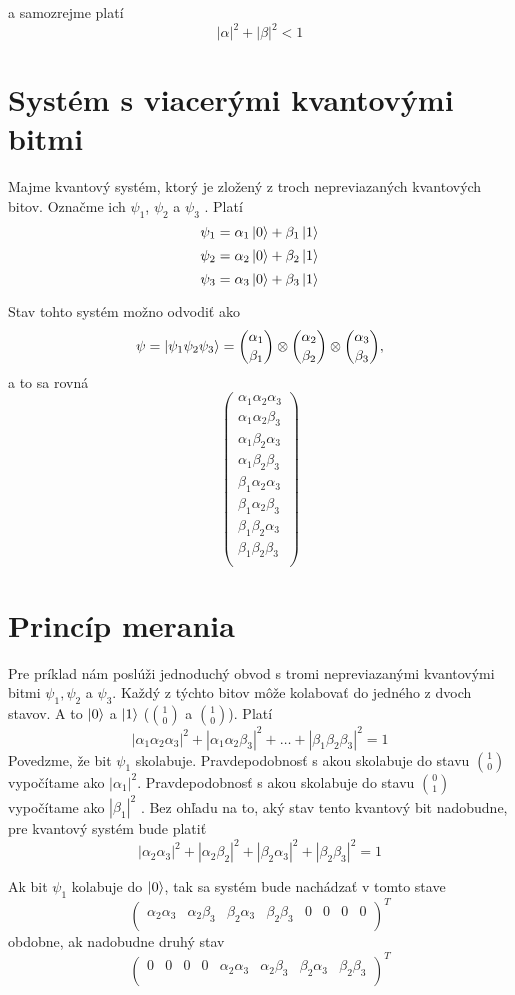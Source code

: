 a samozrejme platí
\[|\alpha|^{2} + |\beta|^{2} < 1\]

\section{Systém s viacerými kvantovými bitmi}
Majme kvantový systém, ktorý je zložený z troch nepreviazaných kvantových bitov.
Označme ich \(\psi_1\), \(\psi_2\) a \(\psi_3\) . Platí
\[\psi_1 = \alpha_1 \Ket{0} + \beta_1 \Ket{1}\]
\[\psi_2 = \alpha_2 \Ket{0} + \beta_2 \Ket{1}\]
\[\psi_3 = \alpha_3 \Ket{0} + \beta_3 \Ket{1}\]

Stav tohto systém možno odvodiť ako
\[\psi = \Ket{\psi_1 \psi_2 \psi_3} = \binom{\alpha_1}{\beta_1} \otimes \binom{\alpha_2}{\beta_2} \otimes \binom{\alpha_3}{\beta_3},\]
 a to sa rovná
\[
\begin{pmatrix}
    \alpha_1 \alpha_2 \alpha_3 \\
    \alpha_1 \alpha_2 \beta_3\\
    \alpha_1 \beta_2 \alpha_3\\
    \alpha_1 \beta_2 \beta_3\\
    \beta_1 \alpha_2 \alpha_3 \\
    \beta_1 \alpha_2 \beta_3\\
    \beta_1 \beta_2 \alpha_3\\
    \beta_1 \beta_2 \beta_3\\

 \end{pmatrix}
\]

\section{Princíp merania}
Pre príklad nám poslúži jednoduchý obvod s tromi nepreviazanými kvantovými 
bitmi \(\psi_1, \psi_2\) a \(\psi_3\). Každý z týchto bitov môže kolabovať do
jedného z dvoch stavov. A to \(\Ket{0}\) a \(\Ket{1}\) (\(\binom{1}{0}\) a
\(\binom{1}{0}\)). Platí
\[|\alpha_1\alpha_2\alpha_3|^2 + |\alpha_1\alpha_2\beta_3|^2 + \dots + |\beta_1\beta_2\beta_3|^2 = 1\]
Povedzme, že bit \(\psi_1\) skolabuje. Pravdepodobnosť s akou skolabuje do
stavu \(\binom{1}{0}\) vypočítame ako \(|\alpha_1|^2\). Pravdepodobnosť s akou 
skolabuje do stavu \(\binom{0}{1}\) vypočítame ako \(|\beta_1|^2\) \cite{Kit95}. Bez ohľadu
na to, aký stav tento kvantový bit nadobudne, pre kvantový systém bude platiť
\[|\alpha_2\alpha_3|^2 + |\alpha_2\beta_2|^2 + |\beta_2\alpha_3|^2 + |\beta_2\beta_3|^2 = 1\]

Ak bit \(\psi_1\) kolabuje do \(\Ket{0}\), tak sa systém bude nachádzať v tomto
stave
\[
\begin{pmatrix}
    \alpha_2 \alpha_3 &
    \alpha_2 \beta_3&
    \beta_2 \alpha_3&
    \beta_2 \beta_3&
    0&
    0&
    0&
    0\\
 \end{pmatrix}^T
\]
obdobne, ak nadobudne druhý stav
\[
\begin{pmatrix}
    0 & 0 & 0 & 0  & \alpha_2 \alpha_3 & \alpha_2 \beta_3 & \beta_2 \alpha_3 & \beta_2 \beta_3 \\
 \end{pmatrix}^T
\]

